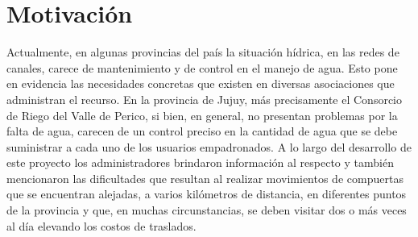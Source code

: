 %
%
%
%
%
%

%
\vspace{2cm}
\section{Motivación}
Actualmente, en algunas provincias del país la situación hídrica, en las redes de canales, carece de mantenimiento y de control en el manejo de agua.
Esto pone en evidencia las necesidades concretas que existen en diversas asociaciones que administran el recurso.
En la provincia de Jujuy, más precisamente el Consorcio de Riego del Valle de Perico, si bien, en general, no presentan problemas por la falta de agua, carecen de un control preciso en la cantidad de agua que se debe suministrar a cada uno de los usuarios empadronados. 
A lo largo del desarrollo de este proyecto los administradores brindaron información al respecto y también mencionaron las dificultades que resultan al realizar movimientos de compuertas que se encuentran alejadas, a varios kilómetros de distancia, en diferentes puntos de la provincia y que, en muchas circunstancias, se deben visitar dos o más veces al día elevando los costos de traslados. 

